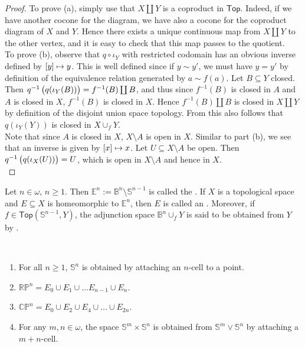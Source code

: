 \begin{proof}
	To prove (a), simply use that $X \coprod Y$ is a coproduct in $\mathsf{Top}$. Indeed, if we have another cocone for the diagram, we have also a cocone for the coproduct diagram of $X$ and $Y$. Hence there exists a unique continuous map from $X \coprod Y$ to the other vertex, and it is easy to check that this map passes to the quotient.\\
	To prove (b), observe that $q \circ \iota_Y$ with restricted codomain has an obvious inverse defined by $\sbr[0]{y} \mapsto y$. This is well defined since if $y {\sim}y'$, we must have $y = y'$ by definition of the equivalence relation generated by $a{\sim}f(a)$. Let $B \subseteq Y$ closed. Then $q^{-1}\del[1]{q(\iota_Y(B))} = f^{-1}(B) \coprod B$, and thus since $f^{-1}(B)$ is closed in $A$ and $A$ is closed in $X$, $f^{-1}(B)$ is closed in $X$. Hence $f^{-1}(B) \coprod B$ is closed in $X \coprod Y$ by definition of the disjoint union space topology. From this also follows that $q(\iota_Y(Y))$ is closed in $X \cup_f Y$.\\
	Note that since $A$ is closed in $X$, $X \setminus A$ is open in $X$. Similar to part (b), we see that an inverse is given by $\sbr{x} \mapsto x$. Let $U \subseteq X \setminus A$ be open. Then $q^{-1}\del[1]{q(\iota_X(U))} = U$, which is open in $X \setminus A$ and hence in $X$.\\
	
\end{proof}

\begin{definition}[Cells]
	Let $n \in \omega$, $n \geq 1$. Then $\mathbb{E}^n := \mathbb{B}^n \setminus \mathbb{S}^{n-1}$ is called the . If $X$ is a topological space and $E \subseteq X$ is homeomorphic to $\mathbb{E}^n$, then $E$ is called an . Moreover, if $f \in \mathsf{Top}(\mathbb{S}^{n-1},Y)$, the adjunction space $\mathbb{B}^n \cup_f Y$ is said to be obtained from $Y$ by . 
\end{definition}

\begin{examples}
	~
	\begin{enumerate}[label = \textup{(}\alph*\textup{)},wide = 0pt]
		\item For all $n \geq 1$, $\mathbb{S}^n$ is obtained by attaching an $n$-cell to a point.
		\item $\mathbb{RP}^n = E_0 \cup E_1 \cup \dots E_{n - 1} \cup E_n$.
		\item $\mathbb{CP}^n = E_0 \cup E_2 \cup E_4 \cup \dots \cup E_{2n}$.
		\item For any $m,n \in \omega$, the space $\mathbb{S}^m \times \mathbb{S}^n$ is obtained from $\mathbb{S}^m \vee \mathbb{S}^n$ by attaching a $m + n$-cell.
	\end{enumerate}
\end{examples}

